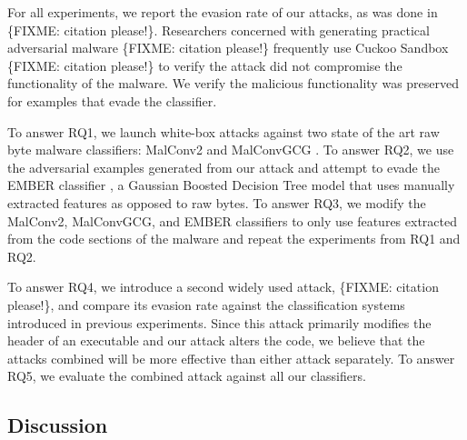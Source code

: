 \documentclass[conference]{IEEEtran}
\begin{document}
For all experiments, we report the evasion rate of our attacks, as was done in \{FIXME: citation please!\}. Researchers concerned with generating practical adversarial malware \{FIXME: citation please!\} frequently use Cuckoo Sandbox \{FIXME: citation please!\} to verify the attack did not compromise the functionality of the malware. We verify the malicious functionality was preserved for examples that evade the classifier.

To answer RQ1, we launch white-box attacks against two state of the art raw byte malware classifiers: MalConv2 and MalConvGCG \cite{raff2021classifying}. To answer RQ2, we use the adversarial examples generated from our attack and attempt to evade the EMBER classifier  \cite{anderson2018ember}, a Gaussian Boosted Decision Tree model that uses manually extracted features as opposed to raw bytes. To answer RQ3, we modify the MalConv2, MalConvGCG, and EMBER classifiers to only use features extracted from the code sections of the malware and repeat the experiments from RQ1 and RQ2. 

To answer RQ4, we introduce a second widely used attack, \{FIXME: citation please!\}, and compare its evasion rate against the classification systems introduced in previous experiments. Since this attack primarily modifies the header of an executable and our attack alters the code, we believe that the attacks combined will be more effective than either attack separately. To answer RQ5, we evaluate the combined attack against all our classifiers.

\subsection{Discussion}
\label{sec:Proposal:Discussion}
\end{document}
